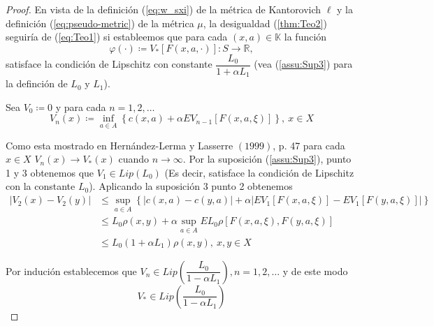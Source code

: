 \documentclass[11pt, spanish]{amsart}
\begin{document}
\begin{proof}
En vista de la definición (\ref{eq:w_sxi}) de la métrica de Kantorovich
$\ell$ y la definición (\ref{eq:pseudo-metric}) de la métrica $\mu$,
la desigualdad (\ref{thm:Teo2}) seguiría de (\ref{eq:Teo1}) si estableemos
que para cada $\left(x,a\right)\in\mathbb{K}$ la función 
\[
\varphi\left(\cdot\right)\coloneqq V_{*}\left[F\left(x,a,\cdot\right)\right]:S\to\mathbb{R},
\]
satisface la condición de Lipschitz con constante $\dfrac{L_{0}}{1+\alpha L_{1}}$
(vea (\ref{assu:Sup3}) para la definción de $L_{0}$ y $L_{1}$).

Sea $V_{0}\coloneqq0$ y para cada $n=1,2,\ldots$ 
\[
V_{n}\left(x\right)\coloneqq\inf_{a\in A}\left\{ c\left(x,a\right)+\alpha EV_{n-1}\left[F\left(x,a,\xi\right)\right]\right\} ,\ x\in X
\]

Como esta mostrado en Hernández-Lerma y Lasserre $\left(1999\right)$,
p. 47 para cada $x\in X$ $V_{n}\left(x\right)\to V_{*}\left(x\right)$
cuando $n\to\infty$. Por la suposición (\ref{assu:Sup3}), punto
1 y $3$ obtenemos que $V_{1}\in Lip\left(L_{0}\right)$ (Es decir,
satisface la condición de Lipschitz con la constante $L_{0}$). Aplicando
la suposición 3 punto 2 obtenemos 
\begin{align*}
\left|V_{2}\left(x\right)-V_{2}\left(y\right)\right| & \leq\sup_{a\in A}\left\{ \left|c\left(x,a\right)-c\left(y,a\right)\right|+\alpha\left|EV_{1}\left[F\left(x,a,\xi\right)\right]-EV_{1}\left[F\left(y,a,\xi\right)\right]\right|\right\} \\
 & \leq L_{0}\rho\left(x,y\right)+\alpha\sup_{a\in A}EL_{0}\rho\left[F\left(x,a,\xi\right),F\left(y,a,\xi\right)\right]\\
 & \leq L_{0}\left(1+\alpha L_{1}\right)\rho\left(x,y\right),\ x,y\in X
\end{align*}

Por indución establecemos que $V_{n}\in Lip\left(\dfrac{L_{0}}{1-\alpha L_{1}}\right),n=1,2,\ldots$
y de este modo 
\[
V_{*}\in Lip\left(\dfrac{L_{0}}{1-\alpha L_{1}}\right)
\]
\end{proof}
\end{document}
